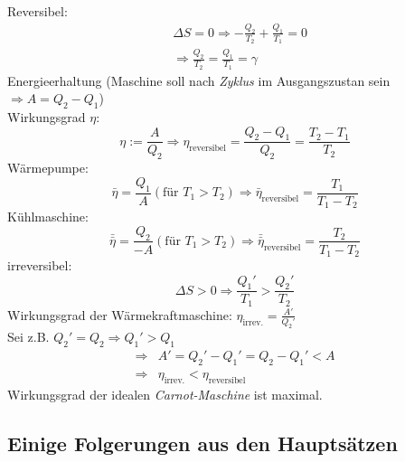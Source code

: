 \begin{enumerate}
    Reversibel:
    \begin{equation}
        \begin{split}
            & \Delta S = 0 \Rightarrow - \frac{Q_2}{T_2} + \frac{Q_1}{T_1} = 0  \\
            & \Rightarrow \frac{Q_2}{T_2} = \frac{Q_1}{T_1} = \gamma
        \end{split}
    \end{equation}
    Energieerhaltung (Maschine soll nach \emph{Zyklus} im Ausgangszustan sein $\Rightarrow A = Q_2 - Q_1$) \\
    Wirkungsgrad $\eta$:
    \begin{equation}
        \eta := \frac{A}{Q_2} \Rightarrow \eta_{\text{reversibel}} = \frac{Q_2 - Q_1}{Q_2} = \frac{T_2 - T_1}{T_2}
    \end{equation}
    Wärmepumpe:
    \begin{equation}
        \bar{\eta} = \frac{Q_1}{A} (\text{für } T_1 > T_2) \Rightarrow \bar{\eta}_{\text{reversibel}} = \frac{T_1}{T_1 - T_2}
    \end{equation}
    Kühlmaschine:
    \begin{equation}
        \bar{\bar{\eta}} = \frac{Q_2}{-A} (\text{für } T_1 > T_2) \Rightarrow \bar{\bar{\eta}}_{\text{reversibel}} = \frac{T_2}{T_1-T_2}
    \end{equation}
    irreversibel:
    \begin{equation}
        \Delta S > 0 \Rightarrow \frac{Q_1'}{T_1} > \frac{Q_2'}{T_2}
    \end{equation}
    Wirkungsgrad der Wärmekraftmaschine: $\eta_{\text{irrev.}} = \frac{A'}{Q_2'}$ \\
    Sei z.B. $Q_2' = Q_2 \Rightarrow Q_1' > Q_1$
    \begin{equation}
        \begin{split}
            \Rightarrow & A' = Q_2' - Q_1' = Q_2 - Q_1' < A \\
            \Rightarrow & \eta_\text{irrev.} < \eta_\text{reversibel}
        \end{split}
    \end{equation}
    Wirkungsgrad der idealen \emph{Carnot-Maschine} ist maximal.
\end{enumerate}

\subsection{Einige Folgerungen aus den Hauptsätzen}
